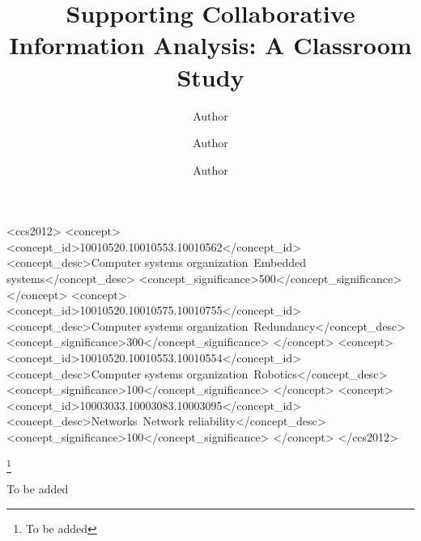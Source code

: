 \documentclass[table, format=acmsmall, review=false, screen=true]{acmart}
\begin{document}
\title{Supporting Collaborative Information Analysis: A Classroom Study}

\author{Author}
\author{Author}
\author{Author}






%
%
\begin{CCSXML}
<ccs2012>
 <concept>
  <concept_id>10010520.10010553.10010562</concept_id>
  <concept_desc>Computer systems organization~Embedded systems</concept_desc>
  <concept_significance>500</concept_significance>
 </concept>
 <concept>
  <concept_id>10010520.10010575.10010755</concept_id>
  <concept_desc>Computer systems organization~Redundancy</concept_desc>
  <concept_significance>300</concept_significance>
 </concept>
 <concept>
  <concept_id>10010520.10010553.10010554</concept_id>
  <concept_desc>Computer systems organization~Robotics</concept_desc>
  <concept_significance>100</concept_significance>
 </concept>
 <concept>
  <concept_id>10003033.10003083.10003095</concept_id>
  <concept_desc>Networks~Network reliability</concept_desc>
  <concept_significance>100</concept_significance>
 </concept>
</ccs2012>
\end{CCSXML}


%
%




\thanks{To be added}


\maketitle

\renewcommand{\shortauthors}{G. Zhou et al.}















\begin{acks}
To be added
\end{acks}



\end{document}
